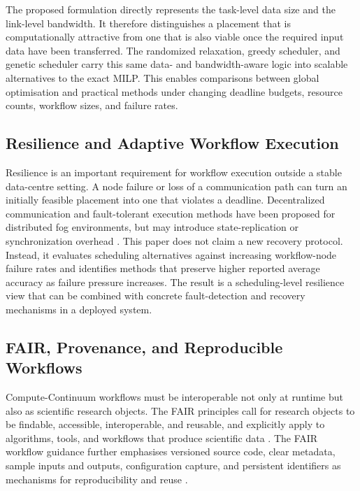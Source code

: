 The proposed formulation directly represents the task-level data size and the link-level bandwidth. It therefore distinguishes a placement that is computationally attractive from one that is also viable once the required input data have been transferred. The randomized relaxation, greedy scheduler, and genetic scheduler carry this same data- and bandwidth-aware logic into scalable alternatives to the exact MILP. This enables comparisons between global optimisation and practical methods under changing deadline budgets, resource counts, workflow sizes, and failure rates.

\subsection{Resilience and Adaptive Workflow Execution}

Resilience is an important requirement for workflow execution outside a stable data-centre setting. A node failure or loss of a communication path can turn an initially feasible placement into one that violates a deadline. Decentralized communication and fault-tolerant execution methods have been proposed for distributed fog environments, but may introduce state-replication or synchronization overhead \cite{xie2023decentralized,zhang2022faulttolerant,wang2023latencyaware}. This paper does not claim a new recovery protocol. Instead, it evaluates scheduling alternatives against increasing workflow-node failure rates and identifies methods that preserve higher reported average accuracy as failure pressure increases. The result is a scheduling-level resilience view that can be combined with concrete fault-detection and recovery mechanisms in a deployed system.

\subsection{FAIR, Provenance, and Reproducible Workflows}

Compute-Continuum workflows must be interoperable not only at runtime but also as scientific research objects. The FAIR principles call for research objects to be findable, accessible, interoperable, and reusable, and explicitly apply to algorithms, tools, and workflows that produce scientific data \cite{wilkinson2016fair}. The FAIR workflow guidance further emphasises versioned source code, clear metadata, sample inputs and outputs, configuration capture, and persistent identifiers as mechanisms for reproducibility and reuse \cite{devisser2023fairworkflows}.

